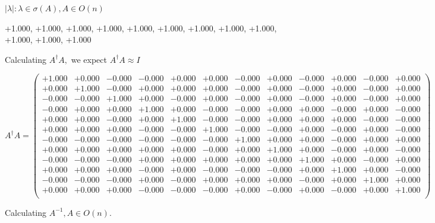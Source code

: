 \documentclass[9pt]{article}
\theoremstyle{plain}
\theoremstyle{definition}
\theoremstyle{remark}
\numberwithin{equation}{section}
\begin{document}
 $|\lambda | : \lambda \in \sigma(A) , A \in O(n)$

+1.000, +1.000, +1.000, +1.000, +1.000, +1.000, +1.000, +1.000, +1.000, +1.000, +1.000, +1.000


Calculating $A^{\dag} A,$  we expect $A^{\dag} A \approx I$

$A^{\dag} A = \left(
\begin{array}{
cccccccccccc}
+1.000 & +0.000 & -0.000 & -0.000 & +0.000 & +0.000 & -0.000 & +0.000 & -0.000 & +0.000 & -0.000 & +0.000 \\
+0.000 & +1.000 & -0.000 & +0.000 & +0.000 & +0.000 & -0.000 & +0.000 & -0.000 & +0.000 & -0.000 & +0.000 \\
-0.000 & -0.000 & +1.000 & +0.000 & -0.000 & +0.000 & -0.000 & +0.000 & -0.000 & +0.000 & -0.000 & +0.000 \\
-0.000 & +0.000 & +0.000 & +1.000 & +0.000 & -0.000 & -0.000 & +0.000 & +0.000 & -0.000 & +0.000 & -0.000 \\
+0.000 & +0.000 & -0.000 & +0.000 & +1.000 & -0.000 & -0.000 & +0.000 & +0.000 & +0.000 & -0.000 & -0.000 \\
+0.000 & +0.000 & +0.000 & -0.000 & -0.000 & +1.000 & -0.000 & -0.000 & +0.000 & -0.000 & +0.000 & -0.000 \\
-0.000 & -0.000 & -0.000 & -0.000 & -0.000 & -0.000 & +1.000 & +0.000 & +0.000 & -0.000 & +0.000 & +0.000 \\
+0.000 & +0.000 & +0.000 & +0.000 & +0.000 & -0.000 & +0.000 & +1.000 & +0.000 & -0.000 & +0.000 & -0.000 \\
-0.000 & -0.000 & -0.000 & +0.000 & +0.000 & +0.000 & +0.000 & +0.000 & +1.000 & +0.000 & -0.000 & +0.000 \\
+0.000 & +0.000 & +0.000 & -0.000 & +0.000 & -0.000 & -0.000 & -0.000 & +0.000 & +1.000 & +0.000 & -0.000 \\
-0.000 & -0.000 & -0.000 & +0.000 & -0.000 & +0.000 & +0.000 & +0.000 & -0.000 & +0.000 & +1.000 & +0.000 \\
+0.000 & +0.000 & +0.000 & -0.000 & -0.000 & -0.000 & +0.000 & -0.000 & +0.000 & -0.000 & +0.000 & +1.000 \\
\end{array}
\right)$ \newline 

Calculating $A^{-1} ,  A \in O(n)$.
\end{document}
